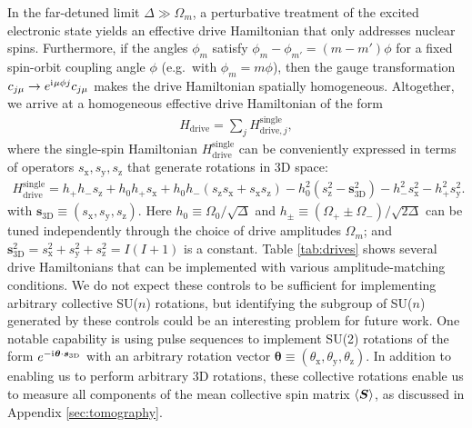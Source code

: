 \documentclass[nofootinbib,notitlepage,11pt]{revtex4-2}
\renewcommand{\t}{\text} %
\newcommand{\p}[1]{\left(#1\right)} %
\newcommand{\bk}{\Braket} %
\renewcommand{\v}{\bm} %
\renewcommand{\c}{\cdot} %
\renewcommand{\i}{\mathrm{i}\mkern1mu} %
\newcommand{\1}{\mathds{1}}
\newcommand{\x}{\text{x}}
\newcommand{\y}{\text{y}}
\newcommand{\z}{\text{z}}
\begin{document}
In the far-detuned limit $\Delta\gg\Omega_m$, a perturbative treatment of the excited electronic state yields an effective drive Hamiltonian that only addresses nuclear spins.
Furthermore, if the angles $\phi_m$ satisfy $\phi_m-\phi_{m'}=\p{m-m'}\phi$ for a fixed spin-orbit coupling angle $\phi$ (e.g.~with $\phi_m=m\phi$), then the gauge transformation $c_{j\mu}\to e^{\i\mu\phi j} c_{j\mu}$ makes the drive Hamiltonian spatially homogeneous.
Altogether, we arrive at a homogeneous effective drive Hamiltonian of the form
\begin{align}
  H_{\t{drive}} = \sum_j H_{\t{drive},j}^{\t{single}},
\end{align}
where the single-spin Hamiltonian $H_{\t{drive}}^{\t{single}}$ can be conveniently expressed in terms of operators $s_\x,s_\y,s_\z$ that generate rotations in 3D space:
\begin{align}
  H_{\t{drive}}^{\t{single}}
  = h_+ h_- s_\z + h_0 h_+ s_\x
  + h_0 h_- \p{s_\z s_\x  + s_\x s_\z}
  - h_0^2\p{s_\z^2-\v s_{\t{3D}}^2} - h_-^2 s_\x^2 - h_+^2 s_\y^2.
\end{align}
with $\v s_{\t{3D}}\equiv\p{s_\x,s_\y,s_\z}$.
Here $h_0\equiv\Omega_0/\sqrt\Delta$ and $h_\pm\equiv\p{\Omega_+\pm\Omega_-}/\sqrt{2\Delta}$ can be tuned independently through the choice of drive amplitudes $\Omega_m$; and $\v s_{\t{3D}}^2=s_\x^2+s_\y^2+s_\z^2=I\p{I+1}$ is a constant.
Table \ref{tab:drives} shows several drive Hamiltonians that can be implemented with various amplitude-matching conditions.
We do not expect these controls to be sufficient for implementing arbitrary collective SU($n$) rotations, but identifying the subgroup of SU($n$) generated by these controls could be an interesting problem for future work.
One notable capability is using pulse sequences to implement SU(2) rotations of the form $e^{-\i\v\theta\c\v s_{\t{3D}}}$ with an arbitrary rotation vector $\v\theta\equiv\p{\theta_\x,\theta_\y,\theta_\z}$.
In addition to enabling us to perform arbitrary 3D rotations, these collective rotations enable us to measure all components of the mean collective spin matrix $\bk{\v S}$, as discussed in Appendix \ref{sec:tomography}.
\end{document}
